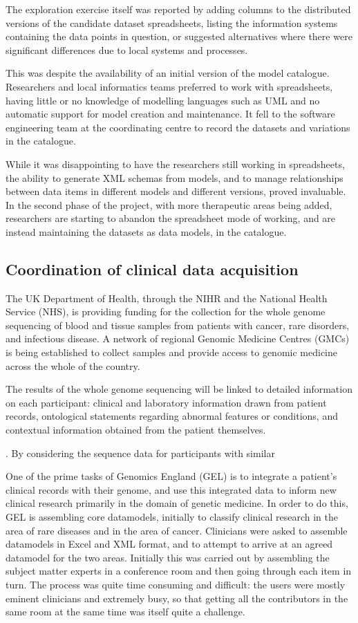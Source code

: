 The exploration exercise itself was reported by adding columns to the
distributed versions of the candidate dataset spreadsheets, listing
the information systems containing the data points in question, or
suggested alternatives where there were significant differences due to
local systems and processes.

This was despite the availability of an initial version of the model
catalogue.  Researchers and local informatics teams preferred to work
with spreadsheets, having little or no knowledge of modelling
languages such as UML and no automatic support for model creation and
maintenance.  It fell to the software engineering team at the
coordinating centre to record the datasets and variations in the
catalogue.

While it was disappointing to have the researchers still working in
spreadsheets, the ability to generate XML schemas from models, and to
manage relationships between data items in different models and
different versions, proved invaluable.  In the second phase of the
project, with more therapeutic areas being added, researchers are
starting to abandon the spreadsheet mode of working, and are instead
maintaining the datasets as data models, in the catalogue.

\subsection{Coordination of clinical data acquisition}

The UK Department of Health, through the NIHR and the National Health
Service (NHS), is providing funding for the collection for the whole
genome sequencing of blood and tissue samples from patients with
cancer, rare disorders, and infectious disease.  A network of regional
Genomic Medicine Centres (GMCs) is being established to collect
samples and provide access to genomic medicine across the whole of the
country.

The results of the whole genome sequencing will be linked to detailed
information on each participant: clinical and laboratory information
drawn from patient records, ontological statements regarding abnormal
features or conditions, and contextual information obtained from the
patient themselves.

.  By considering the sequence
data for participants with similar 

One of the prime tasks of Genomics England (GEL) is to integrate a
patient's clinical records with their genome, and use this integrated
data to inform new clinical research primarily in the domain of
genetic medicine. In order to do this, GEL is assembling core
datamodels, initially to classify clinical research in the area of
rare diseases and in the area of cancer.  Clinicians were asked to
assemble datamodels in Excel and XML format, and to attempt to arrive
at an agreed datamodel for the two areas.  Initially this was carried
out by assembling the subject matter experts in a conference room and
then going through each item in turn. The process was quite time
consuming and difficult: the users were mostly eminent clinicians and
extremely busy, so that getting all the contributors in the same room
at the same time was itself quite a challenge.

